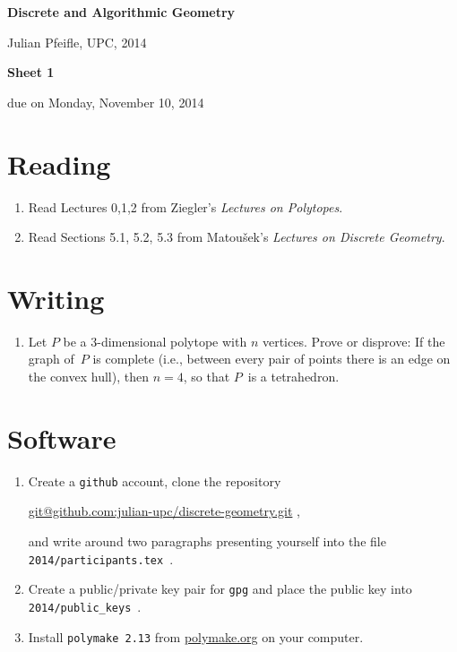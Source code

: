 \documentclass[11pt]{amsart}
\begin{document}
\begin{center}
\textbf{\sffamily
   Discrete and Algorithmic Geometry }

\medskip
   Julian Pfeifle,
   UPC, 2014 \mbox{}
\end{center}

\bigskip

\begin{center}
  \textbf{\sffamily Sheet 1}

\bigskip
 due on Monday, November 10, 2014

\end{center}

\bigskip
\bigskip
\bigskip

\section*{Reading}

\begin{enumerate}
\setlength{\itemsep}{2ex}
\item Read Lectures 0,1,2 from Ziegler's \emph{Lectures on Polytopes}.

\item Read Sections 5.1, 5.2, 5.3 from Matou\v sek's \emph{Lectures on
    Discrete Geometry}.

\end{enumerate}

\bigskip
\bigskip
\section*{Writing}

\begin{enumerate}
\item Let $P$ be a $3$-dimensional polytope with $n$
  vertices. 
  Prove or disprove: 
  If the graph of~$P$ is complete (i.e., between every pair of points
  there is an edge on the convex hull), then $n=4$, so that $P$~is a tetrahedron.
\end{enumerate}

\bigskip
\bigskip
\section*{Software}

\begin{enumerate}
\setlength{\itemsep}{2ex}
\item Create a \texttt{github} account, clone the repository
  \begin{center}
    \url{git@github.com:julian-upc/discrete-geometry.git} ,
  \end{center}
  and write around two paragraphs presenting yourself into the file
  \texttt{2014/participants.tex}~.

\item Create a public/private key pair for \texttt{gpg} and place the
  public key into \texttt{2014/public\_keys}~.

\item Install \texttt{polymake 2.13} from \url{polymake.org} on your computer.
\end{enumerate}
\end{document}
